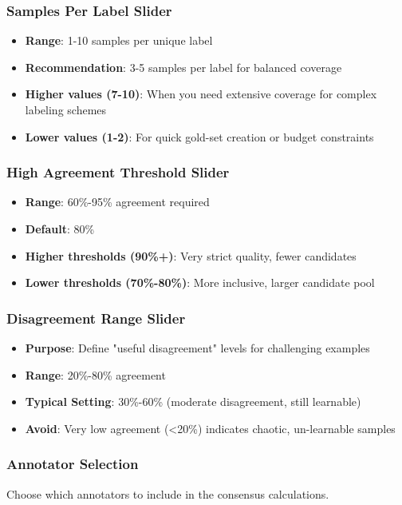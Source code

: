 \documentclass[11pt]{article}
\begin{document}
\subsubsection{Samples Per Label Slider}
\begin{itemize}
\item \textbf{Range}: 1-10 samples per unique label
\item \textbf{Recommendation}: 3-5 samples per label for balanced coverage
\item \textbf{Higher values (7-10)}: When you need extensive coverage for complex labeling schemes
\item \textbf{Lower values (1-2)}: For quick gold-set creation or budget constraints
\end{itemize}

\subsubsection{High Agreement Threshold Slider}
\begin{itemize}
\item \textbf{Range}: 60\%-95\% agreement required
\item \textbf{Default}: 80\%
\item \textbf{Higher thresholds (90\%+)}: Very strict quality, fewer candidates
\item \textbf{Lower thresholds (70\%-80\%)}: More inclusive, larger candidate pool
\end{itemize}

\subsubsection{Disagreement Range Slider}
\begin{itemize}
\item \textbf{Purpose}: Define "useful disagreement" levels for challenging examples
\item \textbf{Range}: 20\%-80\% agreement
\item \textbf{Typical Setting}: 30\%-60\% (moderate disagreement, still learnable)
\item \textbf{Avoid}: Very low agreement (<20\%) indicates chaotic, un-learnable samples
\end{itemize}

\subsubsection{Annotator Selection}
Choose which annotators to include in the consensus calculations.
\end{document}
